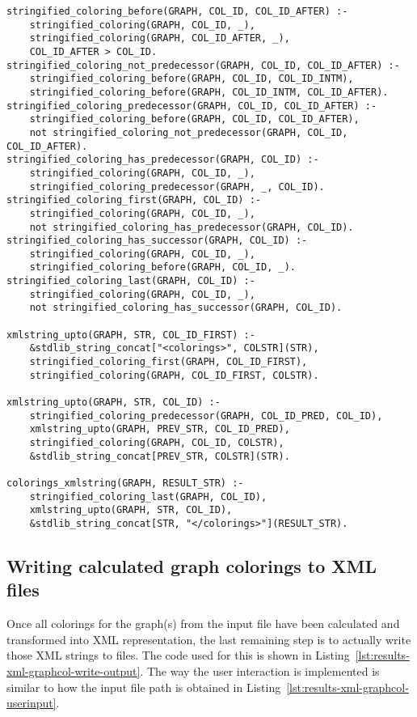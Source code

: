 \begin{lstlisting}[style=asp-code, label={lst:results-xml-graphcol-concat-colorings}, caption={Concatenating XML strings of individual colorings.}]
% Stitch individual coloring strings into one string
stringified_coloring_before(GRAPH, COL_ID, COL_ID_AFTER) :-
    stringified_coloring(GRAPH, COL_ID, _),
    stringified_coloring(GRAPH, COL_ID_AFTER, _),
    COL_ID_AFTER > COL_ID.	
stringified_coloring_not_predecessor(GRAPH, COL_ID, COL_ID_AFTER) :-
    stringified_coloring_before(GRAPH, COL_ID, COL_ID_INTM),
    stringified_coloring_before(GRAPH, COL_ID_INTM, COL_ID_AFTER).
stringified_coloring_predecessor(GRAPH, COL_ID, COL_ID_AFTER) :-
    stringified_coloring_before(GRAPH, COL_ID, COL_ID_AFTER),
    not stringified_coloring_not_predecessor(GRAPH, COL_ID, COL_ID_AFTER).
stringified_coloring_has_predecessor(GRAPH, COL_ID) :- 
    stringified_coloring(GRAPH, COL_ID, _), 
    stringified_coloring_predecessor(GRAPH, _, COL_ID).	
stringified_coloring_first(GRAPH, COL_ID) :- 
    stringified_coloring(GRAPH, COL_ID, _), 
    not stringified_coloring_has_predecessor(GRAPH, COL_ID).	
stringified_coloring_has_successor(GRAPH, COL_ID) :- 
    stringified_coloring(GRAPH, COL_ID, _), 
    stringified_coloring_before(GRAPH, COL_ID, _).	
stringified_coloring_last(GRAPH, COL_ID) :-
    stringified_coloring(GRAPH, COL_ID, _),
    not stringified_coloring_has_successor(GRAPH, COL_ID).

xmlstring_upto(GRAPH, STR, COL_ID_FIRST) :-
    &stdlib_string_concat["<colorings>", COLSTR](STR),
    stringified_coloring_first(GRAPH, COL_ID_FIRST),
    stringified_coloring(GRAPH, COL_ID_FIRST, COLSTR).

xmlstring_upto(GRAPH, STR, COL_ID) :-
    stringified_coloring_predecessor(GRAPH, COL_ID_PRED, COL_ID),
    xmlstring_upto(GRAPH, PREV_STR, COL_ID_PRED),
    stringified_coloring(GRAPH, COL_ID, COLSTR),
    &stdlib_string_concat[PREV_STR, COLSTR](STR).

colorings_xmlstring(GRAPH, RESULT_STR) :-
    stringified_coloring_last(GRAPH, COL_ID),
    xmlstring_upto(GRAPH, STR, COL_ID),
    &stdlib_string_concat[STR, "</colorings>"](RESULT_STR).
\end{lstlisting}  

\subsection{Writing calculated graph colorings to XML files}

Once all colorings for the graph(s) from the input file have been calculated and transformed into XML representation, the last remaining step is to actually write those XML strings to files. The code used for this is shown in Listing~\ref{lst:results-xml-graphcol-write-output}. The way the user interaction is implemented is similar to how the input file path is obtained in Listing~\ref{lst:results-xml-graphcol-userinput}.


